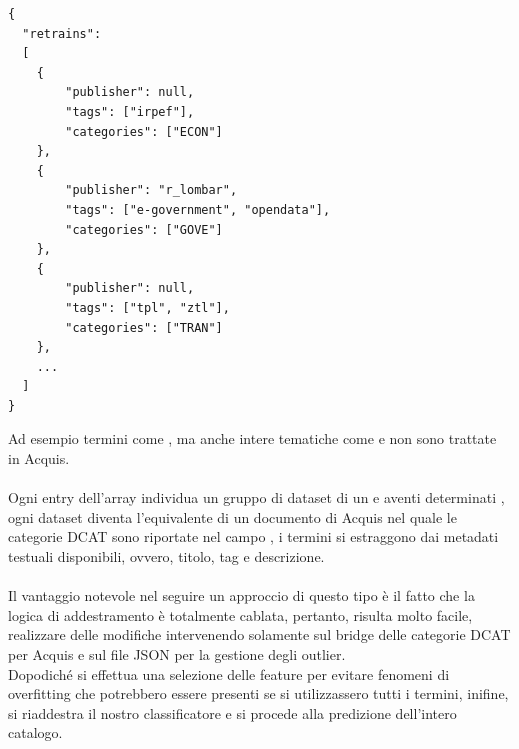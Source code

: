 \documentclass{article}
\theoremstyle{plain}
\theoremstyle{definition}
\begin{document}
\begin{verbatim}
{
  "retrains": 
  [  
  	{
        "publisher": null,
        "tags": ["irpef"],
        "categories": ["ECON"]
    },
  	{
        "publisher": "r_lombar",
        "tags": ["e-government", "opendata"],
        "categories": ["GOVE"]
    },
    {
        "publisher": null,
        "tags": ["tpl", "ztl"], 
        "categories": ["TRAN"]
    },
    ...
  ]  
}
\end{verbatim}
Ad esempio termini come , ma anche intere tematiche come  e  non sono trattate in Acquis.
\\
\\
Ogni entry dell'array  individua un gruppo di dataset di un  e aventi  determinati , ogni dataset diventa l'equivalente di un documento di Acquis nel quale le categorie DCAT sono riportate nel campo , i termini si estraggono dai metadati testuali disponibili, ovvero, titolo, tag e descrizione.
\\
\\
Il vantaggio notevole nel seguire un approccio di questo tipo è il fatto che la logica di addestramento è totalmente cablata, pertanto, risulta molto facile, realizzare delle modifiche intervenendo solamente sul bridge delle categorie DCAT per Acquis e sul file JSON per la gestione degli outlier.
\\
Dopodiché si effettua una selezione delle feature per evitare fenomeni di overfitting che potrebbero essere presenti se si utilizzassero tutti i termini, inifine, si riaddestra il nostro classificatore e si procede alla predizione dell'intero catalogo. 

\newpage
\end{document}
